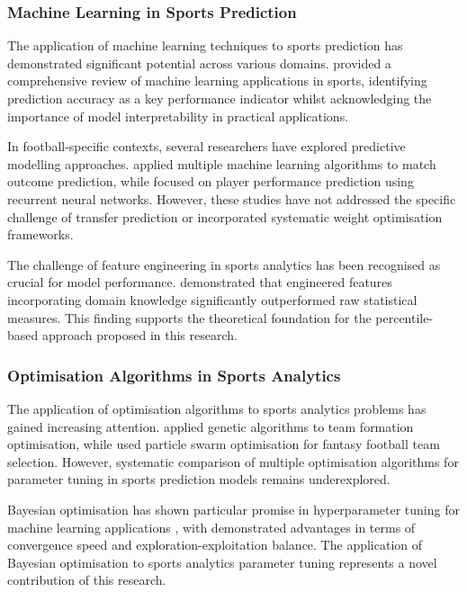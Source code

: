 \subsubsection{Machine Learning in Sports Prediction}

The application of machine learning techniques to sports prediction has demonstrated significant potential across various domains. \citet{bunker2019machine} provided a comprehensive review of machine learning applications in sports, identifying prediction accuracy as a key performance indicator whilst acknowledging the importance of model interpretability in practical applications.

In football-specific contexts, several researchers have explored predictive modelling approaches. \citet{razali2017predicting} applied multiple machine learning algorithms to match outcome prediction, while \citet{hubacek2019learning} focused on player performance prediction using recurrent neural networks. However, these studies have not addressed the specific challenge of transfer prediction or incorporated systematic weight optimisation frameworks.

The challenge of feature engineering in sports analytics has been recognised as crucial for model performance. \citet{bransen2017chemistry} demonstrated that engineered features incorporating domain knowledge significantly outperformed raw statistical measures. This finding supports the theoretical foundation for the percentile-based approach proposed in this research.

\subsubsection{Optimisation Algorithms in Sports Analytics}

The application of optimisation algorithms to sports analytics problems has gained increasing attention. \citet{metulini2018modelling} applied genetic algorithms to team formation optimisation, while \citet{singh2020optimizing} used particle swarm optimisation for fantasy football team selection. However, systematic comparison of multiple optimisation algorithms for parameter tuning in sports prediction models remains underexplored.

Bayesian optimisation has shown particular promise in hyperparameter tuning for machine learning applications \citep{shahriari2015taking}, with demonstrated advantages in terms of convergence speed and exploration-exploitation balance. The application of Bayesian optimisation to sports analytics parameter tuning represents a novel contribution of this research.


